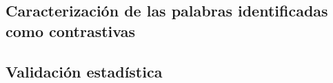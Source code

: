 \subsection{Caracterización de las palabras identificadas como contrastivas}

\subsection{Validación estadística}
